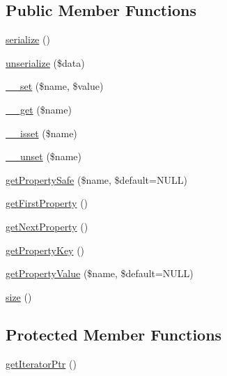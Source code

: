 \subsection*{Public Member Functions}
\begin{DoxyCompactItemize}
\item 
\hyperlink{class_able_polecat___data___structure_abstract_a4d9813fea8525b19a1d370eeb8fe41d6}{serialize} ()
\item 
\hyperlink{class_able_polecat___data___structure_abstract_a91b3cb8a65e42152cacf1cf222bd26f6}{unserialize} (\$data)
\item 
\hyperlink{class_able_polecat___data___structure_abstract_a83c2703c91959192f759992ad5640b67}{\+\_\+\+\_\+set} (\$name, \$value)
\item 
\hyperlink{class_able_polecat___data___structure_abstract_abc8e9e31bb15c8a44c3210ec551407c8}{\+\_\+\+\_\+get} (\$name)
\item 
\hyperlink{class_able_polecat___data___structure_abstract_a8f132f051b7cd7d570ccb9f6e2bb4201}{\+\_\+\+\_\+isset} (\$name)
\item 
\hyperlink{class_able_polecat___data___structure_abstract_a8a93654c7bfe3f0a9bb7af531e513d44}{\+\_\+\+\_\+unset} (\$name)
\item 
\hyperlink{class_able_polecat___data___structure_abstract_a3a24ae252c958a2cdf2d464ddf7d030e}{get\+Property\+Safe} (\$name, \$default=N\+U\+L\+L)
\item 
\hyperlink{class_able_polecat___data___structure_abstract_aba04483e211e71f653da4ab2d79c97ca}{get\+First\+Property} ()
\item 
\hyperlink{class_able_polecat___data___structure_abstract_a758ffef4182dceef4245a5745960e1d7}{get\+Next\+Property} ()
\item 
\hyperlink{class_able_polecat___data___structure_abstract_aa6ad40c977a59df17b723c0bd74460f4}{get\+Property\+Key} ()
\item 
\hyperlink{class_able_polecat___data___structure_abstract_ae19bae5fa6db97601313c55ad17508e9}{get\+Property\+Value} (\$name, \$default=N\+U\+L\+L)
\item 
\hyperlink{class_able_polecat___data___structure_abstract_a775bfb88c1bb7975d67f277eade2a1b7}{size} ()
\end{DoxyCompactItemize}
\subsection*{Protected Member Functions}
\begin{DoxyCompactItemize}
\item 
\hyperlink{class_able_polecat___data___structure_abstract_aa140f09c41ddc988c5bf750453f43836}{get\+Iterator\+Ptr} ()
\end{DoxyCompactItemize}


